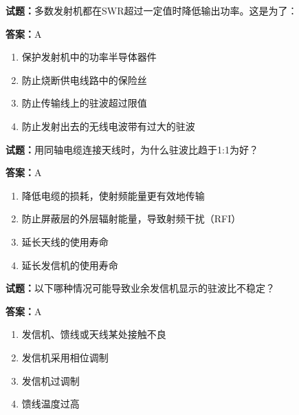 \documentclass{ctexbook}
\begin{document}




\vspace{1em}

\textbf{试题：}多数发射机都在SWR超过一定值时降低输出功率。这是为了： 

\textbf{答案：}A 

\begin{enumerate}[leftmargin=3em]
  \item 保护发射机中的功率半导体器件 

  \item 防止烧断供电线路中的保险丝 

  \item 防止传输线上的驻波超过限值 

  \item 防止发射出去的无线电波带有过大的驻波 

\end{enumerate}





\vspace{1em}

\textbf{试题：}用同轴电缆连接天线时，为什么驻波比趋于1:1为好？ 

\textbf{答案：}A 

\begin{enumerate}[leftmargin=3em]
  \item 降低电缆的损耗，使射频能量更有效地传输 

  \item 防止屏蔽层的外层辐射能量，导致射频干扰（RFI） 

  \item 延长天线的使用寿命 

  \item 延长发信机的使用寿命 

\end{enumerate}





\vspace{1em}

\textbf{试题：}以下哪种情况可能导致业余发信机显示的驻波比不稳定？ 

\textbf{答案：}A 

\begin{enumerate}[leftmargin=3em]
  \item 发信机、馈线或天线某处接触不良 

  \item 发信机采用相位调制 

  \item 发信机过调制 

  \item 馈线温度过高 

\end{enumerate}
\end{document}
